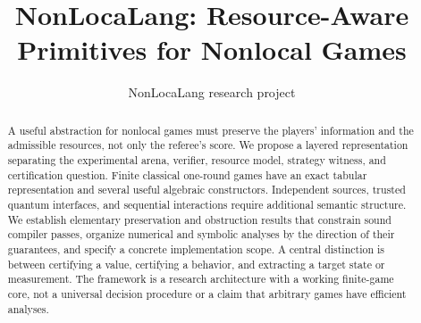 \documentclass[11pt]{article}
\title{NonLocaLang: Resource-Aware Primitives for Nonlocal Games}
\author{NonLocaLang research project}
\date{}
\begin{document}
\maketitle
\begin{abstract}
A useful abstraction for nonlocal games must preserve the players' information and
the admissible resources, not only the referee's score. We propose a layered
representation separating the experimental arena, verifier, resource model,
strategy witness, and certification question. Finite classical one-round games
have an exact tabular representation and several useful algebraic constructors.
Independent sources, trusted quantum interfaces, and sequential interactions
require additional semantic structure. We establish elementary preservation and
obstruction results that constrain sound compiler passes, organize numerical and
symbolic analyses by the direction of their guarantees, and specify a concrete
implementation scope. A central distinction is between certifying a value,
certifying a behavior, and extracting a target state or measurement. The framework
is a research architecture with a working finite-game core, not a universal
decision procedure or a claim that arbitrary games have efficient analyses.
\end{abstract}
\begingroup
\small
\setcounter{tocdepth}{1}
\makeatletter
\renewcommand{\l@section}{\@dottedtocline{1}{0em}{2em}}
\makeatother
\tableofcontents
\endgroup
\clearpage




















\end{document}
